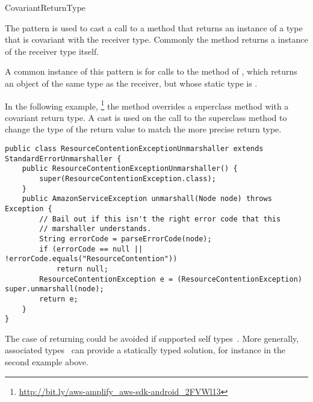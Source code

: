 \begin{pattern}{CovariantReturnType}

The \thisp{} pattern is used to cast a call to a method that returns
an instance of a type that is covariant with the 
receiver type.
Commonly the method returns a instance of the receiver type itself.

\instances{}
A common instance of this pattern is for calls to the 
 method of , which returns an object of the same type as the
receiver, but whose static type is .

In the following example,%
\footnote{\url{http://bit.ly/aws-amplify_aws-sdk-android_2FVWl13}}
the  method overrides a superclass method with a covariant return type.
A cast is used on the call to the superclass method 
to change the type of the return value to match the more precise return type.

\begin{verbatim}
public class ResourceContentionExceptionUnmarshaller extends StandardErrorUnmarshaller {
    public ResourceContentionExceptionUnmarshaller() {
        super(ResourceContentionException.class);
    }
    public AmazonServiceException unmarshall(Node node) throws Exception {
        // Bail out if this isn't the right error code that this
        // marshaller understands.
        String errorCode = parseErrorCode(node);
        if (errorCode == null || !errorCode.equals("ResourceContention"))
            return null;
        ResourceContentionException e = (ResourceContentionException) super.unmarshall(node);
        return e;
    }
}
\end{verbatim}

\discussion{}
  The case of returning  
                 could be avoided if \java{} supported self types~\cite{bruceChallengingTypingIssues2003}.
  More generally, associated types~\cite{chakravartyAssociatedTypeSynonyms2005}
  can provide a statically typed solution, for instance in the second example
  above.

\end{pattern}


